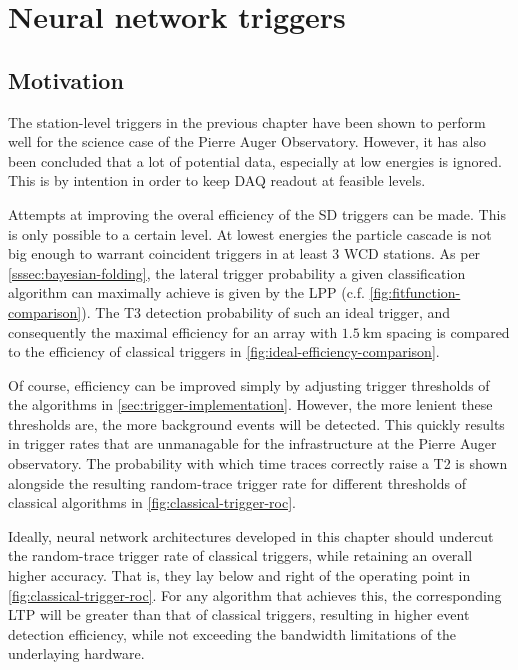 
\chapter{Neural network triggers}
\label{chap:neural-network-triggers}


\section{Motivation}
\label{sec:motivation}

The station-level triggers in the previous chapter have been shown to perform well for the science case of the Pierre Auger Observatory. However, it has 
also been concluded that a lot of potential data, especially at low energies is ignored. This is by intention in order to keep DAQ readout at feasible levels.

Attempts at improving the overal efficiency of the SD triggers can be made. This is only possible to a certain level. At lowest energies the particle cascade is 
not big enough to warrant coincident triggers in at least 3 WCD stations. As per \autoref{sssec:bayesian-folding}, the lateral trigger probability a given 
classification algorithm can maximally achieve is given by the LPP (c.f. \autoref{fig:fitfunction-comparison}). The T3 detection probability of such an ideal 
trigger, and consequently the maximal efficiency for an array with $\SI{1.5}{\kilo\meter}$ spacing is compared to the efficiency of classical triggers in 
\autoref{fig:ideal-efficiency-comparison}.

Of course, efficiency can be improved simply by adjusting trigger thresholds of the algorithms in \autoref{sec:trigger-implementation}. However, the more lenient
these thresholds are, the more background events will be detected. This quickly results in trigger rates that are unmanagable for the infrastructure at the Pierre 
Auger observatory. The probability with which time traces correctly raise a T2 is shown alongside the resulting random-trace trigger rate for different thresholds
of classical algorithms in \autoref{fig:classical-trigger-roc}.

Ideally, neural network architectures developed in this chapter should undercut the random-trace trigger rate of classical triggers, while retaining an overall 
higher accuracy. That is, they lay below and right of the operating point in \autoref{fig:classical-trigger-roc}. For any algorithm that achieves this, the 
corresponding LTP will be greater than that of classical triggers, resulting in higher event detection efficiency, while not exceeding the bandwidth limitations 
of the underlaying hardware. 

